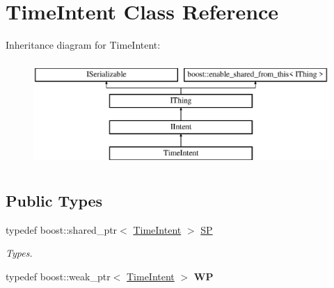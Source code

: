 \hypertarget{class_time_intent}{}\section{Time\+Intent Class Reference}
\label{class_time_intent}
Inheritance diagram for Time\+Intent\+:\begin{figure}[H]
\begin{center}
\leavevmode
\includegraphics[height=4.000000cm]{class_time_intent}
\end{center}
\end{figure}
\subsection*{Public Types}
\begin{DoxyCompactItemize}
\item 
\mbox{\label{class_time_intent_ad4911ff405c69f81bcd014691a4fd1da}} 
typedef boost\+::shared\+\_\+ptr$<$ \hyperlink{class_time_intent}{Time\+Intent} $>$ \hyperlink{class_time_intent_ad4911ff405c69f81bcd014691a4fd1da}{SP}
\begin{DoxyCompactList}\small\item\em Types. \end{DoxyCompactList}\item 
\mbox{\label{class_time_intent_a51e0c53de306a7b4a595b90604da01b6}} 
typedef boost\+::weak\+\_\+ptr$<$ \hyperlink{class_time_intent}{Time\+Intent} $>$ {\bfseries WP}
\end{DoxyCompactItemize}
